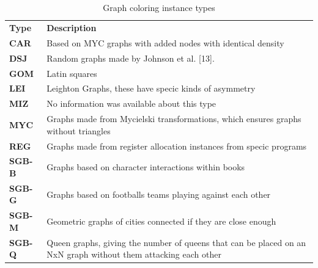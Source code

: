 \documentclass{sig-alternate}
\begin{document}
\section*{}
\begin{table}[h!]
\caption{Graph coloring instance types}
\label{my-label}
\begin{tabular}{ll}
\textbf{Type} & \textbf{Description} \\
\textbf{CAR}   & Based on MYC graphs with added nodes with identical density                                                    \\
\textbf{DSJ}   & Random graphs made by Johnson et al. {[}13{]}.                                                                 \\
\textbf{GOM}   & Latin squares                                                                                                  \\
\textbf{LEI}   & Leighton Graphs, these have specic kinds of asymmetry                                                          \\
\textbf{MIZ}   & No information was available about this type                                                                   \\
\textbf{MYC}   & Graphs made from Mycielski transformations, which ensures graphs without triangles                             \\
\textbf{REG}   & Graphs made from register allocation instances from specic programs                                           \\
\textbf{SGB-B} & Graphs based on character interactions within books                                                            \\
\textbf{SGB-G} & Graphs based on footballs teams playing against each other                                                     \\
\textbf{SGB-M} & Geometric graphs of cities connected if they are close enough                                                  \\
\textbf{SGB-Q} & Queen graphs, giving the number of queens that can be placed on an NxN graph without them attacking each other
\end{tabular}
\end{table}

\section*{}
\end{document}
